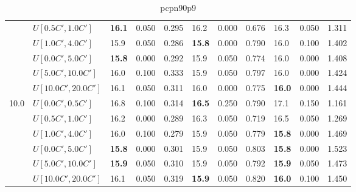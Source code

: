 \begin{table}[h]
{\begin{tabular}{|l|l||l|l|l||l|l|l||l|l|l|}
       & $U[0.5C',1.0C']$ & \textbf{16.1} & 0.050 & 0.295 & 16.2 & 0.000 & 0.676 & 16.3 & 0.050 & 1.311 \\
       & $U[1.0C',4.0C']$ & 15.9 & 0.050 & 0.286 & \textbf{15.8} & 0.000 & 0.790 & 16.0 & 0.100 & 1.402 \\
       & $U[0.0C',5.0C']$ & \textbf{15.8} & 0.000 & 0.292 & 15.9 & 0.050 & 0.774 & 16.0 & 0.000 & 1.408 \\
       & $U[5.0C',10.0C']$ & 16.0 & 0.100 & 0.333 & 15.9 & 0.050 & 0.797 & 16.0 & 0.000 & 1.424 \\
       & $U[10.0C',20.0C']$ & 16.1 & 0.050 & 0.311 & 16.0 & 0.000 & 0.775 & \textbf{16.0} & 0.000 & 1.444 \\
      \hline\hline
      \multirow{6}{*}{10.0} & $U[0.0C',0.5C']$ & 16.8 & 0.100 & 0.314 & \textbf{16.5} & 0.250 & 0.790 & 17.1 & 0.150 & 1.161 \\
       & $U[0.5C',1.0C']$ & 16.2 & 0.000 & 0.289 & 16.3 & 0.050 & 0.719 & 16.5 & 0.050 & 1.269 \\
       & $U[1.0C',4.0C']$ & 16.0 & 0.100 & 0.279 & 15.9 & 0.050 & 0.779 & \textbf{15.8} & 0.000 & 1.469 \\
       & $U[0.0C',5.0C']$ & \textbf{15.8} & 0.000 & 0.301 & 15.9 & 0.050 & 0.803 & \textbf{15.8} & 0.000 & 1.523 \\
       & $U[5.0C',10.0C']$ & \textbf{15.9} & 0.050 & 0.310 & 15.9 & 0.050 & 0.792 & \textbf{15.9} & 0.050 & 1.473 \\
       & $U[10.0C',20.0C']$ & 16.1 & 0.050 & 0.319 & \textbf{15.9} & 0.050 & 0.820 & \textbf{16.0} & 0.100 & 1.450 \\
      \hline
      \end{tabular}
      }
      \caption{pcpn90p9}
      \label{tab:pcpn90p9RecoloredTT}\end{table}


